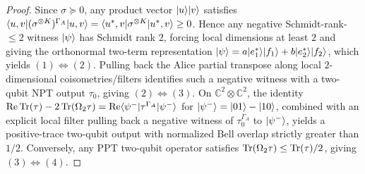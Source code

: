 \begin{proof}
\leanok
Since $\sigma\succeq 0$, any product vector $|u\rangle|v\rangle$ satisfies $\langle u,v|(\sigma^{\otimes K})^{\Gamma_A}|u,v\rangle = \langle u^*,v|\sigma^{\otimes K}|u^*,v\rangle\ge 0$. Hence any negative Schmidt-rank-$\le 2$ witness $|\psi\rangle$ has Schmidt rank $2$, forcing local dimensions at least $2$ and giving the orthonormal two-term representation $|\psi\rangle = a|e_1^*\rangle|f_1\rangle + b|e_2^*\rangle|f_2\rangle$, which yields $(1)\Leftrightarrow(2)$. Pulling back the Alice partial transpose along local $2$-dimensional coisometries/filters identifies such a negative witness with a two-qubit NPT output $\tau_0$, giving $(2)\Leftrightarrow(3)$. On $\mathbb{C}^2\otimes\mathbb{C}^2$, the identity $\operatorname{Re}\operatorname{Tr}(\tau) - 2\operatorname{Tr}(\Omega_2\tau) = \operatorname{Re}\langle \psi^-|\tau^{\Gamma_A}|\psi^-\rangle$ for $|\psi^-\rangle = |01\rangle - |10\rangle$, combined with an explicit local filter pulling back a negative witness of $\tau_0^{\Gamma_A}$ to $|\psi^-\rangle$, yields a positive-trace two-qubit output with normalized Bell overlap strictly greater than $1/2$. Conversely, any PPT two-qubit operator satisfies $\operatorname{Tr}(\Omega_2\tau)\le \operatorname{Tr}(\tau)/2$, giving $(3)\Leftrightarrow(4)$.
\end{proof}

